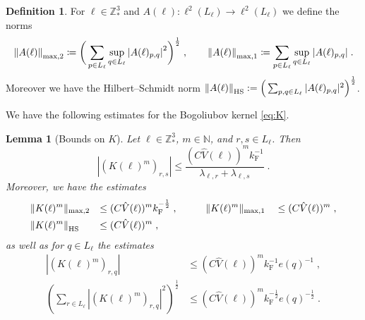 \documentclass[12pt,a4paper]{article}
\numberwithin{equation}{section}
\newcommand{\1}{\mathbb{I}}
\newcommand{\F}{\mathrm{F}}
\newcommand{\HS}{\mathrm{HS}}
\newcommand{\Z}{\mathbb{Z}}
\newcommand{\half}{\frac{1}{2}}
\theoremstyle{plain}
\newtheorem{lemma}[theorem]{Lemma}
\theoremstyle{definition}
\newtheorem{definition}[theorem]{Definition}
\theoremstyle{remark}
\theoremstyle{plain}
\theoremstyle{definition}
\theoremstyle{remark}
\begin{document}
\begin{definition}
For $ \ell \in \Z^3_*$ and $A(\ell) : \ell^2(L_\ell) \to \ell^2(L_\ell)$ we define the norms
\begin{equation}
\begin{aligned}
	\norm{A(\ell)}_{\max,2}
	\coloneq \bigg(\sum_{p \in L_\ell}
	\sup\limits_{q \in L_\ell}
	\abs{A(\ell)_{p,q}}^2\bigg)^\half \;, \qquad
	\norm{A(\ell)}_{\mathrm{max,1}}
	\coloneq \sum_{p \in L_\ell}
	\sup\limits_{q \in L_\ell}
	\abs{A(\ell)_{p,q}} \;.
\end{aligned}
\end{equation}
Moreover we have the Hilbert--Schmidt norm $ \norm{A(\ell)}_{\HS} := \Big( \sum_{p,q \in L_\ell} |A(\ell)_{p,q}|^2 \Big)^{\half} $.
\end{definition}

We have the following estimates for the Bogoliubov kernel \cref{eq:K}.
\begin{lemma}[Bounds on $ K $]\label{lem:normsk}
Let $ \ell \in \Z^3_* $, $ m \in \mathbb{N} $, and $ r,s \in L_\ell $. Then
\begin{equation} \label{eq:K_element_bounds}
	|(K(\ell)^m)_{r,s}|
	\le \frac{(C \hat{V}(\ell))^m k_{\F}^{-1}}{\lambda_{\ell,r} + \lambda_{\ell,s}} \;.
\end{equation}
Moreover, we have the estimates
\begin{equation} \label{eq:K_max_bounds}
\begin{aligned}
	&\Vert K(\ell)^m \Vert_{\max,2}
	&\le \; &(C \hat{V}(\ell))^m k_{\F}^{-\half} \;, \qquad
	&&\Vert K(\ell)^m \Vert_{\max,1}
	&&\le (C \hat{V}(\ell))^m \;, \\
	&\norm{K(\ell)^m}_{\HS}
	&\le \; &(C \hat{V}(\ell))^m \;,
\end{aligned} 
\end{equation}
as well as for $ q \in L_\ell $ the estimates
\begin{equation} \label{eq:e(q)_extraction_bounds}
\begin{split}
	|(K(\ell)^m)_{r,q}|
	& \le (C \hat{V}(\ell))^m k_{\F}^{-1} e(q)^{-1} \;, \\
	\left( \sum_{r \in L_\ell} |(K(\ell)^m)_{r,q}|^2 \right)^{\half}
	& \le (C \hat{V}(\ell))^m k_{\F}^{-\half} e(q)^{-\half} \;.
\end{split}
\end{equation}
\end{lemma}
\end{document}
